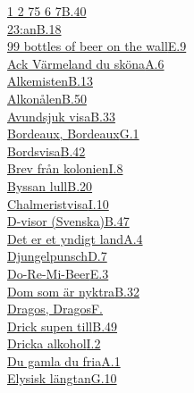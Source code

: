   \hyperref[etttva]{1 2 75 6 7}\dotfill\hyperref[etttva]{B.40}\\
  \hyperref[tjutrean]{23:an}\dotfill\hyperref[tjutrean]{B.18}\\
  \hyperref[bottlesofbeer]{99 bottles of beer on the wall}\dotfill\hyperref[bottlesofbeer]{E.9}\\
  \hyperref[varmeland]{Ack Värmeland du sköna}\dotfill\hyperref[varmeland]{A.6}\\
  \hyperref[alkemisten]{Alkemisten}\dotfill\hyperref[alkemisten]{B.13}\\
  \hyperref[alkonalen]{Alkonålen}\dotfill\hyperref[alkonalen]{B.50}\\
  \hyperref[avundsjukvisa]{Avundsjuk visa}\dotfill\hyperref[avundsjukvisa]{B.33}\\
  \hyperref[bordeaux]{Bordeaux, Bordeaux}\dotfill\hyperref[bordeaux]{G.1}\\
  \hyperref[bordsvisa]{Bordsvisa}\dotfill\hyperref[bordsvisa]{B.42}\\
  \hyperref[brevfrankolonien]{Brev från kolonien}\dotfill\hyperref[brevfrankolonien]{I.8}\\
  \hyperref[byssanlull]{Byssan lull}\dotfill\hyperref[byssanlull]{B.20}\\
  \hyperref[chalmeristvisa]{Chalmeristvisa}\dotfill\hyperref[chalmeristvisa]{I.10}\\
  \hyperref[dvisorsvenska]{D-visor (Svenska)}\dotfill\hyperref[dvisorsvenska]{B.47}\\
  \hyperref[yndigtland]{Det er et yndigt land}\dotfill\hyperref[yndigtland]{A.4}\\
  \hyperref[djungelpunsch]{Djungelpunsch}\dotfill\hyperref[djungelpunsch]{D.7}\\
  \hyperref[doremi]{Do-Re-Mi-Beer}\dotfill\hyperref[doremi]{E.3}\\
  \hyperref[nyktra]{Dom som är nyktra}\dotfill\hyperref[nyktra]{B.32}\\
  \hyperref[dragosdragos]{Dragos, Dragos}\dotfill\hyperref[dragosdragos]{F.}\\
  \hyperref[dricksupentill]{Drick supen till}\dotfill\hyperref[dricksupentill]{B.49}\\
  \hyperref[drickaalkohol]{Dricka alkohol}\dotfill\hyperref[drickaalkohol]{I.2}\\
  \hyperref[dugamla]{Du gamla du fria}\dotfill\hyperref[dugamla]{A.1}\\
  \hyperref[elysisklangtan]{Elysisk längtan}\dotfill\hyperref[elysisklangtan]{G.10}\\

